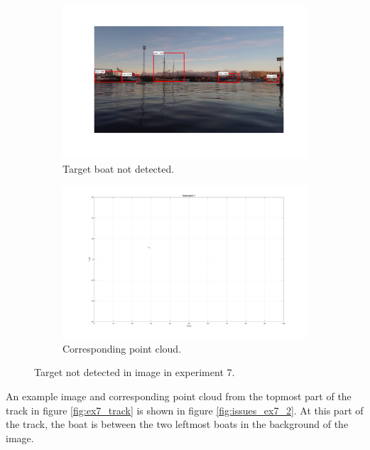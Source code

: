 \begin{figure}[H]
	\centering
	\begin{subfigure}[t]{.5\linewidth}
		\centering
		\includegraphics[width=\linewidth]{fig/ex7_miss_first_circ.png}
		\caption{Target boat not detected.}
		\label{fig:sub_ex7_issue}
	\end{subfigure}%
	\begin{subfigure}[t]{.5\linewidth}
		\centering
		\includegraphics[width=\linewidth]{fig/ex7_miss_first_circ_pc.png}
		\caption{Corresponding point cloud.}
		\label{fig:sub_ex7_issue2}
	\end{subfigure}
	\caption{Target not detected in image in experiment 7.}
	\label{fig:issues_ex7}
\end{figure}
An example image and corresponding point cloud from the topmost part of the track in figure \ref{fig:ex7_track} is shown in figure \ref{fig:issues_ex7_2}. At this part of the track, the boat is between the two leftmost boats in the background of the image.
